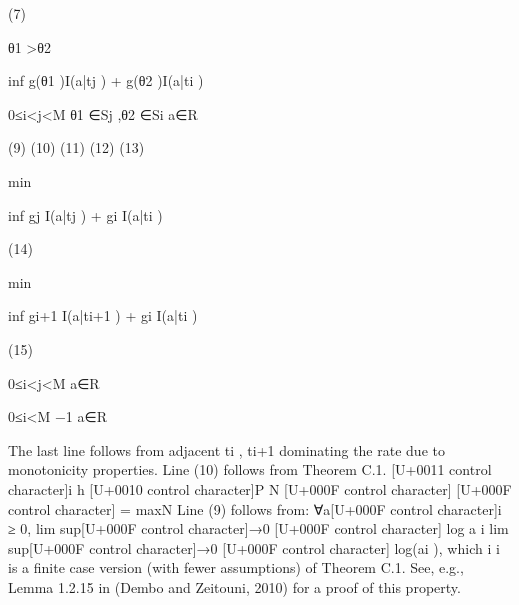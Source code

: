 \documentclass[10pt]{article}
\begin{document}
\begin{ReviewVerbatim}
(7)

θ1 >θ2

inf {g(θ1 )I(a|tj ) + g(θ2 )I(a|ti )}

0≤i<j<M θ1 ∈Sj ,θ2 ∈Si a∈R

(9)
(10)
(11)
(12)
(13)

min

inf {gj I(a|tj ) + gi I(a|ti )}

(14)

min

inf {gi+1 I(a|ti+1 ) + gi I(a|ti )}

(15)

0≤i<j<M a∈R

0≤i<M −1 a∈R

The last line follows from adjacent ti , ti+1 dominating the rate due to monotonicity properties.
Line (10) follows from Theorem C.1.
[U+0011 control character]i
h
[U+0010 control character]P
N [U+000F control character]
[U+000F control character]
= maxN
Line (9) follows from: ∀a[U+000F control character]i ≥ 0, lim sup[U+000F control character]→0 [U+000F control character] log
a
i lim sup[U+000F control character]→0 [U+000F control character] log(ai ), which
i
i
is a finite case version (with fewer assumptions) of Theorem C.1. See, e.g., Lemma 1.2.15 in (Dembo
and Zeitouni, 2010) for a proof of this property.
\end{ReviewVerbatim}
\end{document}
